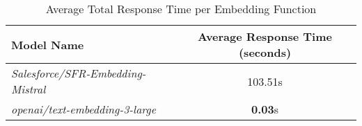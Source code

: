 
\begin{table}[H]
\centering
\begin{tabular}{@{}lc@{}}
\toprule
Model Name & Average Response Time (seconds) \\
\midrule
\textit{Salesforce/SFR-Embedding-Mistral} & 103.51s \\
\textit{openai/text-embedding-3-large} & \textbf{0.03}s \\

\bottomrule
\end{tabular}
\caption{Average Total Response Time per Embedding Function}
\label{tab:average_response_time_embedding_functions}
\end{table}

